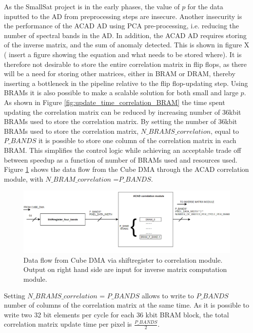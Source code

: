 As the SmallSat project is in the early phases, the value of $p$ for the data inputted to the AD from preprocessing steps are insecure. Another insecurity is the performance of the ACAD AD using PCA pre-processing, i.e. reducing the number of spectral bands in the AD. In addition, the ACAD AD requires storing of the inverse matrix, and the sum of anomaly detected. This is shown in figure X ( insert a figure showing the equation and what needs to be stored where). It is therefore not desirable to store the entire correlation matrix in flip flops, as there will be a need for storing other matrices, either in BRAM or DRAM, thereby inserting a bottleneck in the pipeline relative to the flip flop-updating step. Using BRAMs it is also possible to make a scalable solution for both small and large $p$. 
\\


As shown in Figure \ref{fig:update_time_correlation_BRAM} the time spent updating the correlation matrix can be reduced by increasing number of 36kbit BRAMs used to store the correlation matrix. By setting the  number of 36kbit BRAMs used to store the correlation matrix, $N\_BRAMS\_correlation$, equal to $P\_BANDS$ it is possible to store one column of the correlation matrix in each BRAM. This simplifies the control logic while achieving an acceptable trade off between speedup as a function of number of BRAMs used and resources used. Figure \ref{fig:data_flow_cube_dma_to_inverse} shows the data flow from the Cube DMA through the ACAD correlation module, with $N\_BRAM\_correlation$ =$P\_BANDS$. 
\\


\begin{figure}[H]
\centering
   \includegraphics[scale=0.5]{images/data_flow_cube_dma_to_inverse_module.PNG}
  \caption{Data flow from Cube DMA via shiftregister to correlation module. Output on right hand side are input for inverse matrix computation module.  } 
  \label{fig:data_flow_cube_dma_to_inverse}
\end{figure}

Setting $N\_BRAMS\_correlation$ = $P\_BANDS$ allows to write to $P\_BANDS$ number of columns of the correlation matrix at the same time. As it is possible to write two 32 bit elements per cycle for each 36 kbit BRAM block, the total correlation matrix update time per pixel is $\frac{P\_BANDS}{2}$. 


